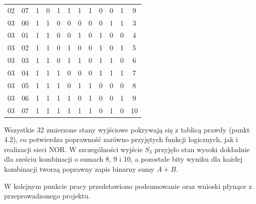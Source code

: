 \documentclass[11pt]{article}
\begin{document}
\begin{table}[H]
\begin{tabular}{cc|ccccc|cccc|c}
02 & 07 & 1 & 0 & 1 & 1 & 1 & 1 & 0 & 0 & 1 & 9 \\
03 & 00 & 1 & 1 & 0 & 0 & 0 & 0 & 0 & 1 & 1 & 3 \\
03 & 01 & 1 & 1 & 0 & 0 & 1 & 0 & 1 & 0 & 0 & 4 \\
03 & 02 & 1 & 1 & 0 & 1 & 0 & 0 & 1 & 0 & 1 & 5 \\
03 & 03 & 1 & 1 & 0 & 1 & 1 & 0 & 1 & 1 & 0 & 6 \\
03 & 04 & 1 & 1 & 1 & 0 & 0 & 0 & 1 & 1 & 1 & 7 \\
03 & 05 & 1 & 1 & 1 & 0 & 1 & 1 & 0 & 0 & 0 & 8 \\
03 & 06 & 1 & 1 & 1 & 1 & 0 & 1 & 0 & 0 & 1 & 9 \\
03 & 07 & 1 & 1 & 1 & 1 & 1 & 1 & 0 & 1 & 0 & 10 \\
\hline
\end{tabular}
\end{table}

Wszystkie 32 zmierzone stany wyjściowe pokrywają się z tablicą prawdy (punkt 4.2), co potwierdza poprawność zarówno przyjętych funkcji logicznych, jak i realizacji sieci NOR. W szczególności wyjście \(S_3\) przyjęło stan wysoki dokładnie dla sześciu kombinacji o sumach 8, 9 i 10, a pozostałe bity wyniku dla każdej kombinacji tworzą poprawny zapis binarny sumy \(A+B\).

W kolejnym punkcie pracy przedstawiono podsumowanie oraz wnioski płynące z przeprowadzonego projektu.
\end{document}
